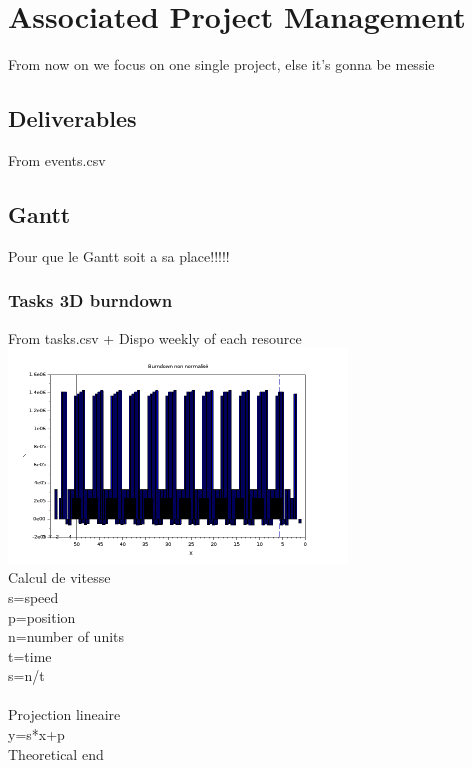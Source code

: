 \documentclass[8pt]{article} %
\begin{document}
\section{Associated Project Management}

From now on we focus on one single project, else it's gonna be messie 
\subsection{Deliverables}
From events.csv
\subsection{Gantt}
Pour que le Gantt soit a sa place!!!!!


\subsubsection{Tasks 3D burndown}
From tasks.csv + Dispo weekly of each resource
%
\includegraphics[width=90mm]{Scilab-burndown.png}
\\
Calcul de vitesse\\
s=speed\\
p=position\\
n=number of units\\
t=time\\
s=n/t\\
\\
Projection lineaire\\
y=s*x+p\\
Theoretical end\\
\end{document}
